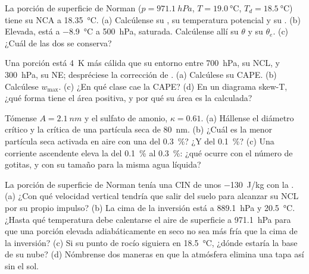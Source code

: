 \begin{exercise}[$\star\star$]\label{exo:b2:atmospheric-thermodynamics:7}
La porción de superficie de Norman ($p = \qty{971.1}{hPa}$, $T = \qty{19.0}{\celsius}$, $T_d =
\qty{18.5}{\celsius}$) tiene su NCA a \qty{18.35}{\celsius}. (a) Calcúlense su , su
temperatura potencial y su . (b) Elevada, está a
\qty{-8.9}{\celsius} a \qty{500}{hPa}, saturada. Calcúlense allí su $\theta$ y su $\theta_e$.
(c) ¿Cuál de las dos se conserva?
\end{exercise}

\begin{exercise}[$\star\star$]\label{exo:b2:atmospheric-thermodynamics:8}
Una porción está \qty{4}{K} más cálida que su entorno entre \qty{700}{hPa}, su NCL, y
\qty{300}{hPa}, su NE; despréciese la corrección de . (a) Calcúlese su CAPE. (b)
Calcúlese $w_{\max}$. (c) ¿En qué clase cae la CAPE? (d) En un diagrama skew-T, ¿qué
forma tiene el área positiva, y por qué su área es la calculada?
\end{exercise}

\begin{exercise}[$\star\star$]\label{exo:b2:atmospheric-thermodynamics:9}
Tómense $A = \qty{2.1}{nm}$ y el sulfato de amonio, $\kappa = 0.61$. (a) Hállense el diámetro crítico
y la  crítica de una partícula seca de \qty{80}{nm}. (b) ¿Cuál es la menor partícula seca
activada en aire con una  del \qty{0.3}{\percent}? ¿Y del \qty{0.1}{\percent}? (c) Una corriente ascendente
eleva la  del \qty{0.1}{\percent} al \qty{0.3}{\percent}: ¿qué ocurre con el
número de gotitas, y con su tamaño para la misma agua líquida?
\end{exercise}

\begin{exercise}[$\star\star\star$]\label{exo:b2:atmospheric-thermodynamics:10}
La porción de superficie de Norman tenía una CIN de unos \qty{-130}{J/kg} con la .
(a) ¿Con qué velocidad vertical tendría que salir del suelo para alcanzar su NCL por su propio
impulso? (b) La cima de la inversión está a \qty{889.1}{hPa} y \qty{20.5}{\celsius}. ¿Hasta qué
temperatura debe calentarse el aire de superficie a \qty{971.1}{hPa} para que una porción elevada adiabáticamente
en seco no sea más fría que la cima de la inversión? (c) Si su punto de rocío siguiera en
\qty{18.5}{\celsius}, ¿dónde estaría la base de su nube? (d) Nómbrense dos maneras en que la atmósfera
elimina una tapa así sin el sol.
\end{exercise}


